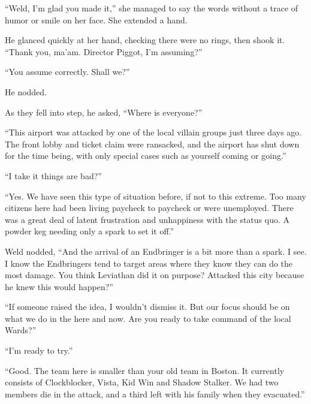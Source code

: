 ``Weld, I'm glad you made it,'' she managed to say the words without a trace of humor or smile on her face.  She extended a hand.



He glanced quickly at her hand, checking there were no rings, then shook it.  ``Thank you, ma'am.  Director Piggot, I'm assuming?''



``You assume correctly.  Shall we?''



He nodded.



As they fell into step, he asked, ``Where is everyone?''



``This airport was attacked by one of the local villain groups just three days ago.  The front lobby and ticket claim were ransacked, and the airport has shut down for the time being, with only special cases such as yourself coming or going.''



``I take it things are bad?''



``Yes.  We have seen this type of situation before, if not to this extreme.  Too many citizens here had been living paycheck to paycheck or were unemployed.  There was a great deal of latent frustration and unhappiness with the status quo.  A powder keg needing only a spark to set it off.''



Weld nodded, ``And the arrival of an Endbringer is a bit more than a spark.  I see.  I know the Endbringers tend to target areas where they know they can do the most damage.  You think Leviathan did it on purpose?  Attacked this city because he knew this would happen?''



``If someone raised the idea, I wouldn't dismiss it.  But our focus should be on what we do in the here and now.  Are you ready to take command of the local Wards?''



``I'm ready to try.''



``Good.  The team here is smaller than your old team in Boston.  It currently consists of Clockblocker, Vista, Kid Win and Shadow Stalker.  We had two members die in the attack, and a third left with his family when they evacuated.''



